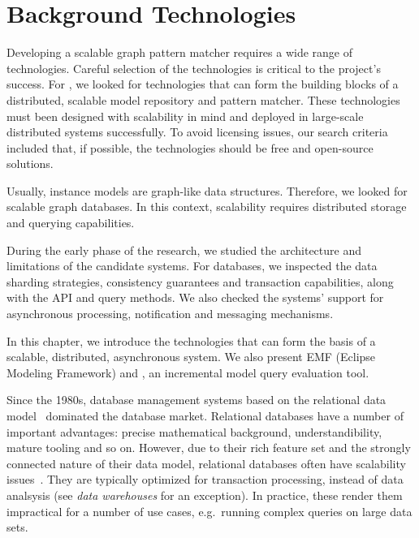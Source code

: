 \chapter{Background Technologies}
\label{chap:background-technologies}

Developing a scalable graph pattern matcher requires a wide range of technologies. Careful selection of the technologies is critical to the project's success. For \iqd{}, we looked for technologies that can form the building blocks of a distributed, scalable model repository and pattern matcher. These technologies must been designed with scalability in mind and deployed in large-scale distributed systems successfully. To avoid licensing issues, our search criteria included that, if possible, the technologies should be free and open-source solutions.

Usually, instance models are graph-like data structures. Therefore, we looked for scalable graph databases. In this context, scalability requires distributed storage and querying capabilities.

During the early phase of the research, we studied the architecture and limitations of the candidate systems. For databases, we inspected the data sharding strategies, consistency guarantees and transaction capabilities, along with the API and query methods. We also checked the systems' support for asynchronous processing, notification and messaging mechanisms.

In this chapter, we introduce the technologies that can form the basis of a scalable, distributed, asynchronous system. We also present EMF (Eclipse Modeling Framework) and \eiq{}, an incremental model query evaluation tool.



Since the 1980s, database management systems based on the relational data model~\cite{Codd:1970:RMD:362384.362685} dominated the database market. Relational databases have a number of important advantages: precise mathematical background, understandibility, mature tooling and so on. However, due to their rich feature set and the strongly connected nature of their data model, relational databases often have scalability issues~\cite{Jacobs:2009:PBD:1536616.1536632, Sakr13}. They are typically optimized for transaction processing, instead of data analsysis (see \emph{data warehouses} for an exception). In practice, these render them impractical for a number of use cases, e.g.\ running complex queries on large data sets.

